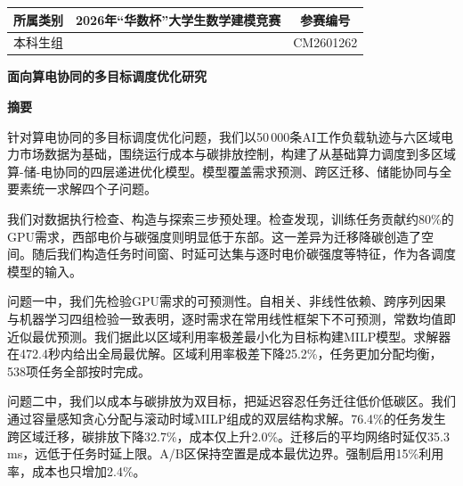 
\begin{center}
\begin{tabular}{|c|c|c|}
\hline
所属类别 & 2026年“华数杯”大学生数学建模竞赛 & 参赛编号 \\
\hline
本科生组 & & CM2601262 \\
\hline
\end{tabular}
\end{center}
\vspace{1em}

\begin{center}
{\Large\bfseries 面向算电协同的多目标调度优化研究}
\end{center}
\vspace{0.5em}
\begin{center}
{\bfseries 摘\quad 要}
\end{center}
\vspace{0.5em}

针对算电协同的多目标调度优化问题，我们以50\,000条AI工作负载轨迹与六区域电力市场数据为基础，围绕运行成本与碳排放控制，构建了从基础算力调度到多区域算-储-电协同的四层递进优化模型。模型覆盖需求预测、跨区迁移、储能协同与全要素统一求解四个子问题。

我们对数据执行检查、构造与探索三步预处理。检查发现，训练任务贡献约80\%的GPU需求，西部电价与碳强度则明显低于东部。这一差异为迁移降碳创造了空间。随后我们构造任务时间窗、时延可达集与逐时电价碳强度等特征，作为各调度模型的输入。

问题一中，我们先检验GPU需求的可预测性。自相关、非线性依赖、跨序列因果与机器学习四组检验一致表明，逐时需求在常用线性框架下不可预测，常数均值即近似最优预测。我们据此以区域利用率极差最小化为目标构建MILP模型。求解器在472.4秒内给出全局最优解。区域利用率极差下降25.2\%，任务更加分配均衡，538项任务全部按时完成。

问题二中，我们以成本与碳排放为双目标，把延迟容忍任务迁往低价低碳区。我们通过容量感知贪心分配与滚动时域MILP组成的双层结构求解。76.4\%的任务发生跨区域迁移，碳排放下降32.7\%，成本仅上升2.0\%。迁移后的平均网络时延仅35.3 ms，远低于任务时延上限。A/B区保持空置是成本最优边界。强制启用15\%利用率，成本也只增加2.4\%。

